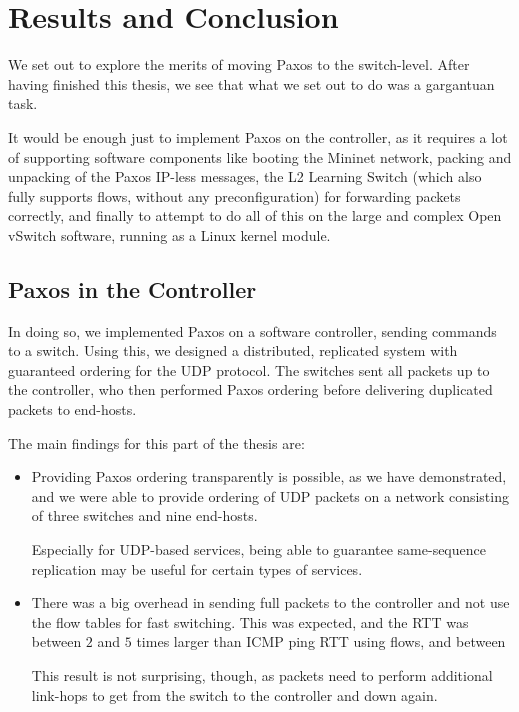 \chapter{Results and Conclusion}
\label{chapter:conclusion}

We set out to explore the merits of moving Paxos to the switch-level.
After having finished this thesis, we see that what we set out to do was a
gargantuan task.

It would be enough just to implement Paxos on the
controller, as it requires a lot of supporting software components like
booting the Mininet network, packing and unpacking of the Paxos IP-less
messages, the L2 Learning Switch (which also fully supports flows, without
any preconfiguration) for forwarding packets correctly, and finally to
attempt to do all of this on the large and complex Open vSwitch software,
running as a Linux kernel module.

\section{Paxos in the Controller}

In doing so, we implemented Paxos on a software controller, sending commands
to a switch.  Using this, we designed a distributed, replicated system with
guaranteed ordering for the UDP protocol.  The switches sent all packets up
to the controller, who then performed Paxos ordering before delivering
duplicated packets to end-hosts.

The main findings for this part of the thesis are:

\begin{itemize}
  \item Providing Paxos ordering transparently is possible, as we have
  demonstrated, and we were able to provide ordering of \acs{UDP} packets on
  a network consisting of three switches and nine end-hosts.

  Especially for UDP-based services, being able to guarantee same-sequence
  replication may be useful for certain types of services.


  \item There was a big overhead in sending full packets to the controller
  and not use the flow tables for fast switching.  This was expected, and
  the \acs{RTT} was between $2$ and $5$ times larger than ICMP ping RTT
  using flows, and between

  This result is not surprising, though, as packets need to perform
  additional link-hops to get from the switch to the controller and down
  again.

\end{itemize}

